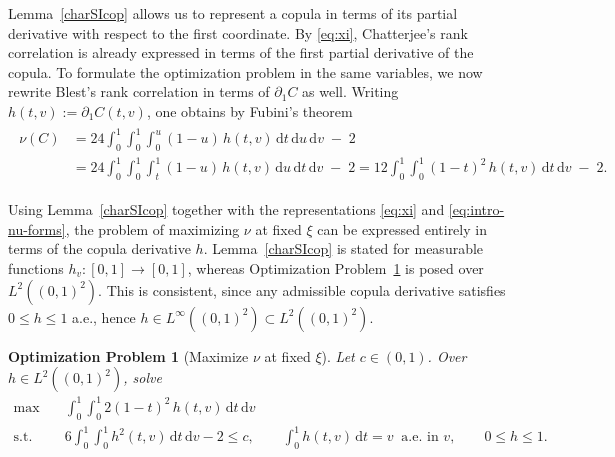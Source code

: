 \documentclass{article}
\newtheorem{optimizationproblem}[theorem]{Optimization Problem}
\newcommand{\1}{\mathds{1}}
\newcommand{\de}{\mathrm{\,d}}
\begin{document}
Lemma~\ref{charSIcop} allows us to represent a copula in terms of its partial derivative with respect to the first coordinate.
By \eqref{eq:xi}, Chatterjee's rank correlation is already expressed in terms of the first partial derivative of the copula.
To formulate the optimization problem in the same variables, we now rewrite Blest's rank correlation in terms of \(\partial_1 C\) as well.
Writing \(h(t,v):=\partial_1 C(t,v)\), one obtains by Fubini's theorem
\begin{align}\begin{aligned}\label{eq:intro-nu-forms}
  \nu(C)
  &= 24 \int_0^1\!\!\int_0^1 \int_{0}^{u} (1-u)\,h(t,v)\de t\de u\de v \;-\; 2  \\[0.3em]
  &= 24 \int_0^1\!\!\int_0^1 \int_{t}^{1} (1-u)\,h(t,v)\de u\de t\de v \;-\; 2
   = 12 \int_0^1\!\!\int_0^1 (1-t)^2\,h(t,v)\de t\de v \;-\; 2.
\end{aligned}\end{align}

Using Lemma~\ref{charSIcop} together with the representations \eqref{eq:xi} and \eqref{eq:intro-nu-forms}, the problem of maximizing $\nu$ at fixed $\xi$ can be expressed entirely in terms of the copula derivative $h$.
Lemma~\ref{charSIcop} is stated for measurable functions \(h_v\colon[0,1]\to[0,1]\), whereas Optimization Problem~\ref{opt:main} is posed over \(L^2((0,1)^2)\).
This is consistent, since any admissible copula derivative satisfies \(0\le h\le 1\) a.e., hence \(h\in L^\infty((0,1)^2)\subset L^2((0,1)^2)\).

\begin{optimizationproblem}[Maximize $\nu$ at fixed $\xi$]\label{opt:main}
Let $c\in(0,1)$.
Over $h\in L^2((0,1)^2)$, solve
\begin{align*}
\max &\quad \int_0^1\int_0^1 2(1-t)^2\,h(t,v)\de t\de v\\
\text{s.t.}&\quad 6\int_0^1\int_0^1 h^2(t,v)\de t\de v-2\le c, \qquad \int_0^1 h(t,v)\de t=v\ \text{ a.e.\ in }v,\qquad
0\le h\le 1.
\end{align*}
\end{optimizationproblem}
\end{document}
